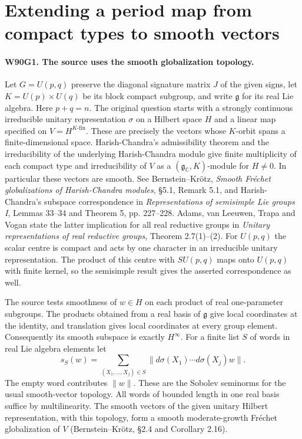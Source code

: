 \section{Extending a period map from compact types to smooth vectors}

\paragraph{W90G1. The source uses the smooth globalization topology.}
Let $G=U(p,q)$ preserve the diagonal signature matrix $J$ of the
given signs, let $K=U(p)\times U(q)$ be its block compact subgroup,
and write $\mathfrak g$ for its real Lie algebra. Here $p+q=n$.
The original question starts with a strongly continuous irreducible
unitary representation $\sigma$ on a Hilbert space $H$ and a linear
map specified on $V=H^{K\text{-fin}}$. These are precisely the
vectors whose $K$-orbit spans a finite-dimensional space.
Harish-Chandra's admissibility theorem and the irreducibility
of the underlying Harish-Chandra module give finite multiplicity of
each compact type and irreducibility of $V$ as a
$(\mathfrak g_{\mathbb C},K)$-module for $H\ne0$.
In particular these vectors are smooth. See
Bernstein--Kr\"otz, \emph{Smooth Fr\'echet globalizations of
Harish-Chandra modules}, \S5.1, Remark 5.1, and Harish-Chandra's
subspace correspondence in \emph{Representations of semisimple
Lie groups I}, Lemmas 33--34 and Theorem 5, pp. 227--228.
Adams, van Leeuwen, Trapa and Vogan state the latter implication for
all real reductive groups in \emph{Unitary representations of real
reductive groups}, Theorem 2.7(1)--(2).
For $U(p,q)$ the scalar centre is compact and acts by one character
in an irreducible unitary representation. The product of this centre
with $SU(p,q)$ maps onto $U(p,q)$ with finite kernel, so the
semisimple result gives the asserted correspondence as well.

The source tests smoothness of $w\in H$ on each product of real
one-parameter subgroups. The products obtained from a real basis of
$\mathfrak g$ give local coordinates at the identity, and translation
gives local coordinates at every group element. Consequently its smooth
subspace is exactly $H^\infty$. For a finite list $S$ of words in
real Lie algebra elements let
\[
 s_S(w)=\sum_{(X_1,\ldots,X_j)\in S}
              \|d\sigma(X_1)\cdots d\sigma(X_j)w\|.
\]
The empty word contributes $\|w\|$. These are the Sobolev seminorms
for the usual smooth-vector topology. All words of bounded length
in one real basis suffice by multilinearity. The smooth vectors of
the given unitary Hilbert representation, with this topology, form
a smooth moderate-growth Fr\'echet globalization of $V$
(Bernstein--Kr\"otz, \S2.4 and Corollary 2.16).

